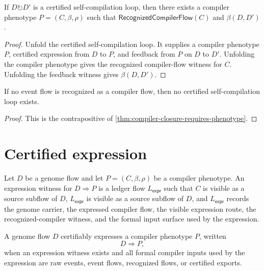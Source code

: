 \begin{theorem}
\label{thm:compiler-closure-requires-phenotype}
If $D\circlearrowright D'$ is a certified self-compilation loop, then there
exists a compiler phenotype $P=(C,\beta,\rho)$ such that
$\mathsf{RecognizedCompilerFlow}(C)$ and $\beta(D,D')$.
\end{theorem}
\begin{proof}
Unfold the certified self-compilation loop. It supplies a compiler phenotype
$P$, certified expression from $D$ to $P$, and feedback from $P$ on $D$ to
$D'$. Unfolding the compiler phenotype gives the recognized compiler-flow
witness for $C$. Unfolding the feedback witness gives $\beta(D,D')$.
\end{proof}

\begin{corollary}
\label{cor:compiler-closure-no-recognized-compiler-no-loop}
If no event flow is recognized as a compiler flow, then no certified
self-compilation loop exists.
\end{corollary}
\begin{proof}
This is the contrapositive of
\autoref{thm:compiler-closure-requires-phenotype}.
\end{proof}

\section{Certified expression}
\label{sec:compiler-closure-certified-expression}

\begin{definition}
\label{def:compiler-closure-expression-witness}
Let $D$ be a genome flow and let $P=(C,\beta,\rho)$ be a compiler phenotype.
An expression witness for $D\Rightarrow P$ is a ledger flow
$L_{\mathsf{expr}}$ such that $C$ is visible as a source subflow of $D$,
$L_{\mathsf{expr}}$ is visible as a source subflow of $D$, and
$L_{\mathsf{expr}}$ records the genome carrier, the expressed compiler flow,
the visible expression route, the recognized-compiler witness, and the formal
input surface used by the expression.
\end{definition}

\begin{definition}
\label{def:compiler-closure-certified-expression}
A genome flow $D$ certifiably expresses a compiler phenotype $P$, written
$$
D\Rightarrow P,
$$
when an expression witness exists and all formal compiler inputs used by the
expression are raw events, event flows, recognized flows, or certified exports.
\end{definition}


